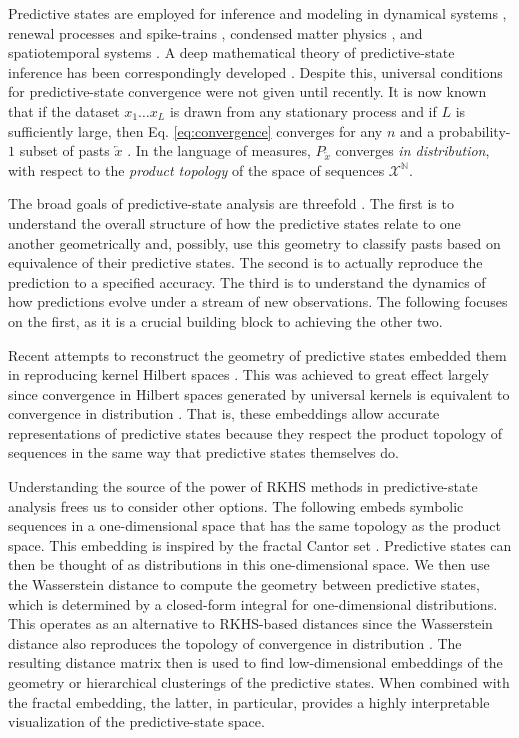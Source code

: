 \documentclass[sigconf, anonymous, review]{acmart}
\begin{document}
Predictive states are employed for inference and modeling in dynamical
systems \cite{Crut92c,Emen16a,Salo19a}, renewal processes and spike-trains
\cite{Marz14e,Marz15a}, condensed matter physics \cite{Varn12a,Varn14a}, and
spatiotemporal systems \cite{Rupe19a,Rupe19b,Rupe20a}. A deep mathematical
theory of predictive-state inference has been correspondingly developed
\cite{Jaeg00a,Shal02a,Jame04a,Stil07b,Stre13a,Thon15a,Marz19a,Brod20a}. Despite
this, universal conditions for predictive-state convergence were not given until
recently. It is now known that if the dataset $x_1 \dots x_L$ is drawn from any
stationary process and if $L$ is sufficiently large, then Eq.
\eqref{eq:convergence} converges for any $n$ and a probability-$1$ subset of
pasts $\overleftarrow{x}$ \cite{Loom21a}. In the language of measures,
$P_{\overleftarrow{x}}$ converges \emph{in distribution}, with respect to the
\emph{product topology} of the space of sequences $\mathcal{X}^\mathbb{N}$.

The broad goals of predictive-state analysis are threefold \cite{Shal98a}. The
first is to understand the overall structure of how the predictive states
relate to one another geometrically and, possibly, use this geometry to
classify pasts based on equivalence of their predictive states. The second is
to actually reproduce the prediction to a specified accuracy. The third is to
understand the dynamics of how predictions evolve under a stream of new
observations. The following focuses on the first, as it is a crucial building
block to achieving the other two.

Recent attempts to reconstruct the geometry of predictive states embedded them
in reproducing kernel Hilbert spaces
\cite{Song09a,Song10a,Boot13a,Brod20a,Loom21a}. This was achieved to great
effect largely since convergence in Hilbert spaces generated by universal
kernels is equivalent to convergence in distribution \cite{Srip10a}. That is,
these embeddings allow accurate representations of predictive states because
they respect the product topology of sequences in the same way that predictive
states themselves do. 

Understanding the source of the power of RKHS methods in predictive-state
analysis frees us to consider other options. The following embeds
symbolic sequences in a one-dimensional space that has the same topology as the
product space. This embedding is inspired by the fractal Cantor set
\cite{Kurk03a}. Predictive states can then be thought of as distributions in
this one-dimensional space. We then use the Wasserstein distance to compute the
geometry between predictive states, which is determined by a closed-form
integral for one-dimensional distributions. This operates as an alternative to
RKHS-based distances since the Wasserstein distance also reproduces the
topology of convergence in distribution \cite{Pane19a}. The resulting distance
matrix then is used to find low-dimensional embeddings \cite{Borg05a} of the
geometry or hierarchical clusterings \cite{Mull11a} of the predictive states.
When combined with the fractal embedding, the latter, in particular, provides a
highly interpretable visualization of the predictive-state space.
\end{document}
